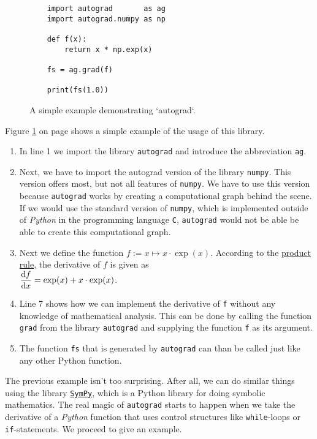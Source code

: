 \begin{figure}[!ht]
\centering
\begin{verbatim}
    import autograd       as ag
    import autograd.numpy as np
    
    def f(x):
        return x * np.exp(x)
    
    fs = ag.grad(f)

    print(fs(1.0))
\end{verbatim}
\vspace*{-0.3cm}
\caption{A simple example demonstrating `autograd`.}
\label{fig:autograd-intro-1.ipynb}
\end{figure}

Figure \ref{fig:autograd-intro-1.ipynb} on page \pageref{fig:autograd-intro-1.ipynb} shows a simple example of
the usage of this library.
\begin{enumerate}
\item In line 1 we import the library \texttt{autograd} and introduce the abbreviation \texttt{ag}.
\item Next, we have to import the autograd version of the library \texttt{numpy}.  This version offers most, but
      not all features of \texttt{numpy}.  We have to use this version because \texttt{autograd} works by creating a
      computational graph behind the scene.  If we would use the standard version of \texttt{numpy}, which is
      implemented outside of \textsl{Python} in the programming language \texttt{C}, \texttt{autograd} would not be able
      be able to create this computational graph.
\item Next we define the function $f := x \mapsto x \cdot \exp(x)$.  According to the
      \href{https://en.wikipedia.org/wiki/Product_rule}{product rule}, the
      derivative of $f$ is given as 
      \\[0.2cm]
      \hspace*{1.3cm}
      $\displaystyle \frac{\mathrm{d} f}{\mathrm{d} x} = \exp(x) + x \cdot \exp(x)$.
\item Line 7 shows how we can implement the derivative of \texttt{f} without any knowledge of mathematical
      analysis.  This can be done by calling the function \texttt{grad} from the library \texttt{autograd} and
      supplying the function \texttt{f} as its argument.
\item The function \texttt{fs} that is generated by \texttt{autograd} can than be called just like any other
      Python function.
\end{enumerate}
The previous example isn't too surprising.  After all, we can do similar things using the library
\href{https://www.sympy.org/en/index.html}{\texttt{SymPy}}, which is a Python library for doing symbolic
mathematics.  The real magic of \texttt{autograd} starts to happen when we take the derivative of a
\textsl{Python} function that uses control structures like \texttt{while}-loops or \texttt{if}-statements.
We proceed to give an example.


